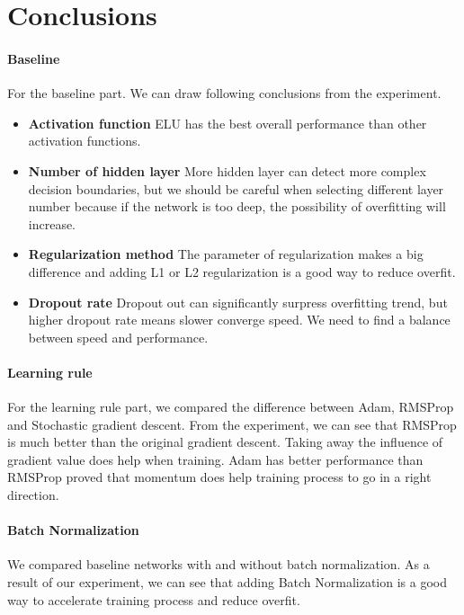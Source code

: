 \documentclass{article}
\begin{document}
\section{Conclusions}
\label{sec:concl}
\paragraph{Baseline} For the baseline part. We can draw following conclusions from the experiment. 
\begin{itemize}
	\item \textbf{Activation function} ELU has the best overall performance than other activation functions.
	\item \textbf{Number of hidden layer} More hidden layer can detect more complex decision boundaries, but we should be careful when selecting different layer number because if the network is too deep, the possibility of overfitting will increase.
	\item \textbf{Regularization method} The parameter of regularization makes a big difference and adding L1 or L2 regularization is a good way to reduce overfit.
	\item \textbf{Dropout rate} Dropout out can significantly surpress overfitting trend, but higher dropout rate means slower converge speed. We need to find  a balance between speed and performance.

\end{itemize}

\paragraph{Learning rule} For the learning rule part, we compared the difference between Adam, RMSProp and Stochastic gradient descent. From the experiment, we can see that RMSProp is much better than the original gradient descent. Taking away the influence of gradient value does help when training. Adam has better performance than RMSProp  proved that momentum does help training process to go in a right direction.

\paragraph{Batch Normalization} We compared baseline networks with and without batch normalization. As a result of our experiment, we can see that adding Batch Normalization is a good way to accelerate training process and reduce overfit.
\end{document}
